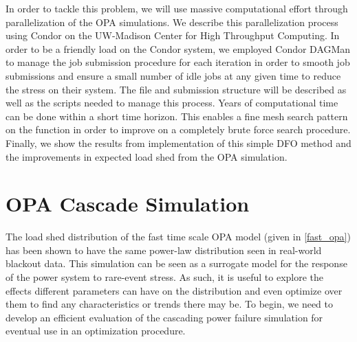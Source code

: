 In order to tackle this problem, we will use massive computational effort through parallelization of the OPA simulations.  We describe this parallelization process using Condor on the UW-Madison Center for High Throughput Computing.  In order to be a friendly load on the Condor system, we employed Condor DAGMan to manage the job submission procedure for each iteration in order to smooth job submissions and ensure a small number of idle jobs at any given time to reduce the stress on their system.  The file and submission structure will be described as well as the scripts needed to manage this process.  Years of computational time can be done within a short time horizon.  This enables a fine mesh search pattern on the function in order to improve on a completely brute force search procedure.  Finally, we show the results from implementation of this simple DFO method and the improvements in expected load shed from the OPA simulation.


\section{OPA Cascade Simulation}

The load shed distribution of the fast time scale OPA model (given in \cref{fast_opa}) has been shown to have the same power-law distribution seen in real-world blackout data.  This simulation can be seen as a surrogate model for the response of the power system to rare-event stress.  As such, it is useful to explore the effects different parameters can have on the distribution and even optimize over them to find any characteristics or trends there may be. To begin, we need to develop an efficient evaluation of the cascading power failure simulation for eventual use in an optimization procedure. 

